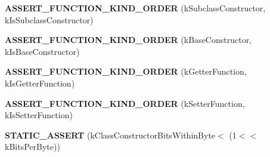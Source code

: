 \begin{DoxyCompactItemize}
\item 
{\bfseries A\+S\+S\+E\+R\+T\+\_\+\+F\+U\+N\+C\+T\+I\+O\+N\+\_\+\+K\+I\+N\+D\+\_\+\+O\+R\+D\+ER} (k\+Subclass\+Constructor, k\+Is\+Subclass\+Constructor)\hypertarget{classv8_1_1internal_1_1_shared_function_info_a625b5c569c9e74463b929eedf2fd116b}{}\label{classv8_1_1internal_1_1_shared_function_info_a625b5c569c9e74463b929eedf2fd116b}

\item 
{\bfseries A\+S\+S\+E\+R\+T\+\_\+\+F\+U\+N\+C\+T\+I\+O\+N\+\_\+\+K\+I\+N\+D\+\_\+\+O\+R\+D\+ER} (k\+Base\+Constructor, k\+Is\+Base\+Constructor)\hypertarget{classv8_1_1internal_1_1_shared_function_info_af001f34333eeb3f0fd93a40594e33b5b}{}\label{classv8_1_1internal_1_1_shared_function_info_af001f34333eeb3f0fd93a40594e33b5b}

\item 
{\bfseries A\+S\+S\+E\+R\+T\+\_\+\+F\+U\+N\+C\+T\+I\+O\+N\+\_\+\+K\+I\+N\+D\+\_\+\+O\+R\+D\+ER} (k\+Getter\+Function, k\+Is\+Getter\+Function)\hypertarget{classv8_1_1internal_1_1_shared_function_info_af917c857f167e489e08b482a17eb9e62}{}\label{classv8_1_1internal_1_1_shared_function_info_af917c857f167e489e08b482a17eb9e62}

\item 
{\bfseries A\+S\+S\+E\+R\+T\+\_\+\+F\+U\+N\+C\+T\+I\+O\+N\+\_\+\+K\+I\+N\+D\+\_\+\+O\+R\+D\+ER} (k\+Setter\+Function, k\+Is\+Setter\+Function)\hypertarget{classv8_1_1internal_1_1_shared_function_info_a23f6a0ae247b81c1229f99aabe0c76a1}{}\label{classv8_1_1internal_1_1_shared_function_info_a23f6a0ae247b81c1229f99aabe0c76a1}

\item 
{\bfseries S\+T\+A\+T\+I\+C\+\_\+\+A\+S\+S\+E\+RT} (k\+Class\+Constructor\+Bits\+Within\+Byte$<$ (1$<$$<$ k\+Bits\+Per\+Byte))\hypertarget{classv8_1_1internal_1_1_shared_function_info_af72e68b4a4b6feaadbe6a7483e63d610}{}\label{classv8_1_1internal_1_1_shared_function_info_af72e68b4a4b6feaadbe6a7483e63d610}

\end{DoxyCompactItemize}
